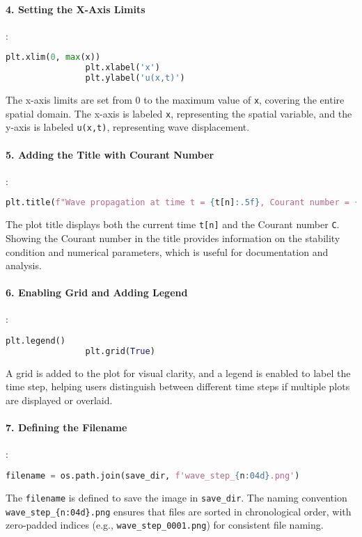 \documentclass{article}
\begin{document}
			\paragraph{4. Setting the X-Axis Limits}
			:
			\begin{lstlisting}[language=Python]
				plt.xlim(0, max(x))
				plt.xlabel('x')
				plt.ylabel('u(x,t)')
			\end{lstlisting}
			The x-axis limits are set from \(0\) to the maximum value of \texttt{x}, covering the entire spatial domain. The x-axis is labeled \texttt{x}, representing the spatial variable, and the y-axis is labeled \texttt{u(x,t)}, representing wave displacement.
			
			\paragraph{5. Adding the Title with Courant Number}
			:
			\begin{lstlisting}[language=Python]
				plt.title(f"Wave propagation at time t = {t[n]:.5f}, Courant number = {C}")
			\end{lstlisting}
			The plot title displays both the current time \texttt{t[n]} and the Courant number \texttt{C}. Showing the Courant number in the title provides information on the stability condition and numerical parameters, which is useful for documentation and analysis.
			
			\paragraph{6. Enabling Grid and Adding Legend}
			:
			\begin{lstlisting}[language=Python]
				plt.legend()
				plt.grid(True)
			\end{lstlisting}
			A grid is added to the plot for visual clarity, and a legend is enabled to label the time step, helping users distinguish between different time steps if multiple plots are displayed or overlaid.
			
			\paragraph{7. Defining the Filename}
			:
			\begin{lstlisting}[language=Python]
				filename = os.path.join(save_dir, f'wave_step_{n:04d}.png')
			\end{lstlisting}
			The \texttt{filename} is defined to save the image in \texttt{save\_dir}. The naming convention \texttt{wave\_step\_\{n:04d\}.png} ensures that files are sorted in chronological order, with zero-padded indices (e.g., \texttt{wave\_step\_0001.png}) for consistent file naming.
			
\end{document}
